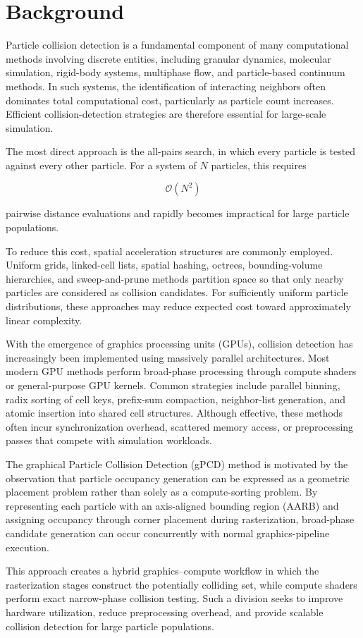 \section{Background}

Particle collision detection is a fundamental component of many computational methods involving discrete entities, including granular dynamics, molecular simulation, rigid-body systems, multiphase flow, and particle-based continuum methods. In such systems, the identification of interacting neighbors often dominates total computational cost, particularly as particle count increases. Efficient collision-detection strategies are therefore essential for large-scale simulation.

The most direct approach is the all-pairs search, in which every particle is tested against every other particle. For a system of $N$ particles, this requires

\[
\mathcal{O}(N^2)
\]

pairwise distance evaluations and rapidly becomes impractical for large particle populations.

To reduce this cost, spatial acceleration structures are commonly employed. Uniform grids, linked-cell lists, spatial hashing, octrees, bounding-volume hierarchies, and sweep-and-prune methods partition space so that only nearby particles are considered as collision candidates. For sufficiently uniform particle distributions, these approaches may reduce expected cost toward approximately linear complexity.

With the emergence of graphics processing units (GPUs), collision detection has increasingly been implemented using massively parallel architectures. Most modern GPU methods perform broad-phase processing through compute shaders or general-purpose GPU kernels. Common strategies include parallel binning, radix sorting of cell keys, prefix-sum compaction, neighbor-list generation, and atomic insertion into shared cell structures. Although effective, these methods often incur synchronization overhead, scattered memory access, or preprocessing passes that compete with simulation workloads.

The graphical Particle Collision Detection (gPCD) method is motivated by the observation that particle occupancy generation can be expressed as a geometric placement problem rather than solely as a compute-sorting problem. By representing each particle with an axis-aligned bounding region (AARB) and assigning occupancy through corner placement during rasterization, broad-phase candidate generation can occur concurrently with normal graphics-pipeline execution.

This approach creates a hybrid graphics--compute workflow in which the rasterization stages construct the potentially colliding set, while compute shaders perform exact narrow-phase collision testing. Such a division seeks to improve hardware utilization, reduce preprocessing overhead, and provide scalable collision detection for large particle populations.

